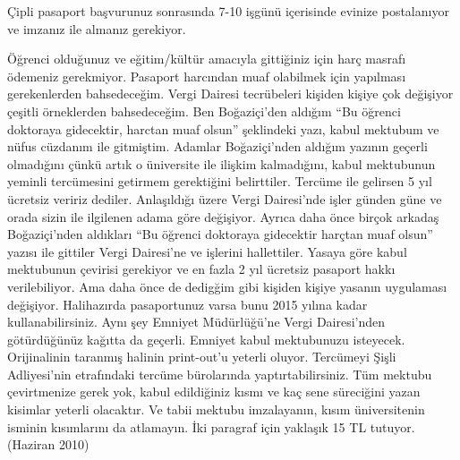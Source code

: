 \documentclass[12pt]{article}
\begin{document}
Çipli pasaport başvurunuz sonrasında 7-10 işgünü içerisinde evinize postalanıyor ve imzanız ile almanız gerekiyor. 

Öğrenci olduğunuz ve eğitim/kültür amacıyla gittiğiniz için harç masrafı ödemeniz gerekmiyor. Pasaport harcından muaf olabilmek için yapılması gerekenlerden bahsedeceğim. Vergi Dairesi tecrübeleri kişiden kişiye çok değişiyor çeşitli örneklerden bahsedeceğim. Ben Boğaziçi'den aldığım ``Bu öğrenci doktoraya gidecektir, harctan muaf olsun'' şeklindeki yazı, kabul mektubum ve nüfus cüzdanım ile gitmiştim. Adamlar Boğaziçi'nden aldığım yazının geçerli olmadığını çünkü artık o üniversite ile ilişkim kalmadığını, kabul mektubunun yeminli tercümesini getirmem gerektiğini belirttiler. Tercüme ile gelirsen 5 yıl ücretsiz veririz dediler. Anlaşıldığı üzere Vergi Dairesi'nde işler günden güne ve orada sizin ile ilgilenen adama göre değişiyor. Ayrıca daha önce birçok arkadaş Boğaziçi'nden aldıkları ``Bu öğrenci doktoraya gidecektir harçtan muaf olsun'' yazısı ile gittiler Vergi Dairesi'ne ve işlerini hallettiler. Yasaya göre kabul mektubunun çevirisi gerekiyor ve en fazla 2 yıl ücretsiz pasaport hakkı verilebiliyor. Ama daha önce de dedigğim gibi kişiden kişiye yasanın uygulaması değişiyor.  Halihazırda pasaportunuz varsa bunu 2015 yılına kadar kullanabilirsiniz. Aynı şey Emniyet Müdürlüğü'ne Vergi Dairesi’nden götürdüğünüz kağıtta da geçerli. Emniyet kabul mektubunuzu isteyecek. Orijinalinin taranmış halinin print-out'u yeterli oluyor. Tercümeyi Şişli Adliyesi'nin etrafındaki tercüme bürolarında yaptırtabilirsiniz. Tüm mektubu çevirtmenize gerek yok, kabul edildiğiniz kısmı ve kaç sene süreciğini yazan kisimlar yeterli olacaktır. Ve tabii mektubu imzalayanın, kısım üniversitenin isminin kısımlarını da atlamayın. İki paragraf için yaklaşık 15 TL tutuyor. (Haziran 2010) 
\end{document}
